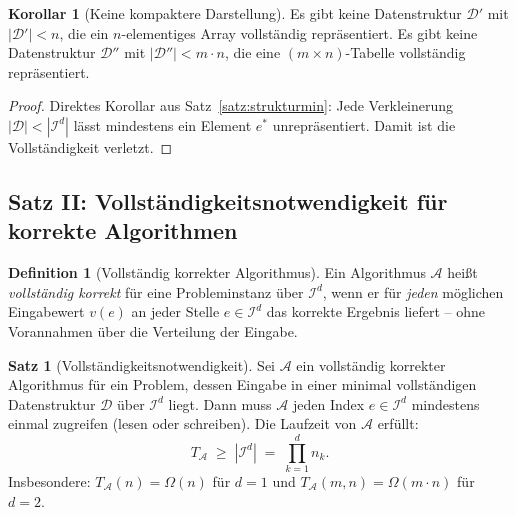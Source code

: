 ﻿\documentclass[a4paper,12pt]{article}
\theoremstyle{definition}
\newtheorem{definition}{Definition}
\newtheorem{satz}{Satz}
\newtheorem{korollar}{Korollar}
\begin{document}
\begin{korollar}[Keine kompaktere Darstellung]
    \label{kor:nochkompakter}
    Es gibt keine Datenstruktur $\mathcal{D}'$ mit $|\mathcal{D}'| < n$,
    die ein $n$-elementiges Array vollst\"{a}ndig repr\"{a}sentiert.
    Es gibt keine Datenstruktur $\mathcal{D}''$ mit $|\mathcal{D}''| < m \cdot n$,
    die eine $(m \times n)$-Tabelle vollst\"{a}ndig repr\"{a}sentiert.
\end{korollar}

\begin{proof}
    Direktes Korollar aus Satz~\ref{satz:strukturmin}: Jede Verkleinerung
    $|\mathcal{D}| < |\mathcal{I}^d|$ l\"{a}sst mindestens ein Element $e^*$
    unrepräsentiert. Damit ist die Vollst\"{a}ndigkeit verletzt. \qedhere
\end{proof}

\subsection{Satz II: Vollst\"{a}ndigkeitsnotwendigkeit f\"{u}r korrekte Algorithmen}

\begin{definition}[Vollst\"{a}ndig korrekter Algorithmus]
    \label{def:vollalgo}
    Ein Algorithmus $\mathcal{A}$ hei\ss{}t \emph{vollst\"{a}ndig korrekt} f\"{u}r
    eine Probleminstanz \"{u}ber $\mathcal{I}^d$, wenn er f\"{u}r \emph{jeden}
    m\"{o}glichen Eingabewert $v(e)$ an jeder Stelle $e \in \mathcal{I}^d$ das
    korrekte Ergebnis liefert -- ohne Vorannahmen \"{u}ber die Verteilung der Eingabe.
\end{definition}

\begin{satz}[Vollst\"{a}ndigkeitsnotwendigkeit]
    \label{satz:vollnotw}
    Sei $\mathcal{A}$ ein vollst\"{a}ndig korrekter Algorithmus f\"{u}r ein Problem,
    dessen Eingabe in einer minimal vollst\"{a}ndigen Datenstruktur $\mathcal{D}$
    \"{u}ber $\mathcal{I}^d$ liegt. Dann muss $\mathcal{A}$ jeden Index
    $e \in \mathcal{I}^d$ mindestens einmal zugreifen (lesen oder schreiben).
    Die Laufzeit von $\mathcal{A}$ erf\"{u}llt:
    \[
        T_{\mathcal{A}} \;\geq\; |\mathcal{I}^d| \;=\; \prod_{k=1}^d n_k.
    \]
    Insbesondere: $T_{\mathcal{A}}(n) = \Omega(n)$ f\"{u}r $d=1$ und
    $T_{\mathcal{A}}(m,n) = \Omega(m \cdot n)$ f\"{u}r $d=2$.
\end{satz}
\end{document}
